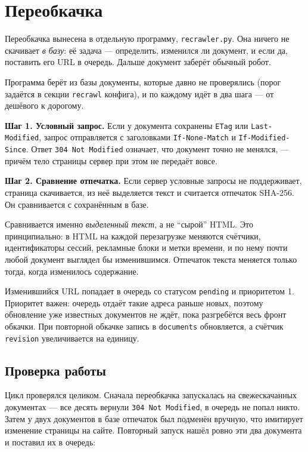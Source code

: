 \section{Переобкачка}

Переобкачка вынесена в отдельную программу, \texttt{recrawler.py}. Она ничего не
скачивает \emph{в базу}: её задача --- определить, изменился ли документ, и если
да, поставить его URL в очередь. Дальше документ заберёт обычный робот.

Программа берёт из базы документы, которые давно не проверялись (порог задаётся
в секции \texttt{recrawl} конфига), и по каждому идёт в два шага --- от дешёвого
к дорогому.

\textbf{Шаг 1. Условный запрос.} Если у документа сохранены \texttt{ETag} или
\texttt{Last-Modified}, запрос отправляется с заголовками
\texttt{If-None-Match} и \texttt{If-Modified-Since}. Ответ \texttt{304 Not
Modified} означает, что документ точно не менялся, --- причём тело страницы
сервер при этом не передаёт вовсе.

\textbf{Шаг 2. Сравнение отпечатка.} Если сервер условные запросы не
поддерживает, страница скачивается, из неё выделяется текст и считается
отпечаток SHA-256. Он сравнивается с сохранённым в базе.

Сравнивается именно \emph{выделенный текст}, а не \enquote{сырой} HTML. Это
принципиально: в HTML на каждой перезагрузке меняются счётчики, идентификаторы
сессий, рекламные блоки и метки времени, и по нему почти любой документ выглядел
бы изменившимся. Отпечаток текста меняется только тогда, когда изменилось
содержание.

Изменившийся URL попадает в очередь со статусом \texttt{pending} и приоритетом
1. Приоритет важен: очередь отдаёт такие адреса раньше новых, поэтому обновление
уже известных документов не ждёт, пока разгребётся весь фронт обкачки. При
повторной обкачке запись в \texttt{documents} обновляется, а счётчик
\texttt{revision} увеличивается на единицу.

\subsection*{Проверка работы}

Цикл проверялся целиком. Сначала переобкачка запускалась на свежескачанных
документах --- все десять вернули \texttt{304 Not Modified}, в очередь не попал
никто. Затем у двух документов в базе отпечаток был подменён вручную, что
имитирует изменение страницы на сайте. Повторный запуск нашёл ровно эти два
документа и поставил их в очередь:

